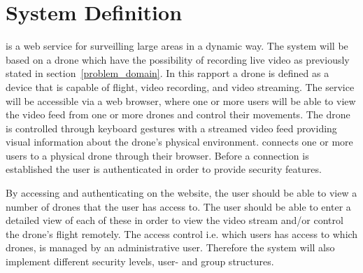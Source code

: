 \section{System Definition}
\projectname{} is a web service for surveilling large areas in a dynamic way. 
The system will be based on a drone which have the possibility of recording live video as previously stated in section~\ref{problem_domain}.
In this rapport a drone is defined as a device that is capable of flight, video recording, and video streaming.
The service will be accessible via a web browser, where one or more users will be able to view the video feed from one or more drones and control their movements. 
The drone is controlled through keyboard gestures with a streamed video feed providing visual information about the drone's physical environment. 
\projectname{} connects one or more users to a physical drone through their browser. 
Before a connection is established the user is authenticated in order to provide security features.

By accessing and authenticating on the website, the user should be able to view a number of drones that the user has access to.
The user should be able to enter a detailed view of each of these in order to view the video stream and/or control the drone's flight remotely. 
The access control i.e. which users has access to which drones, is managed by an administrative user.
Therefore the system will also implement different security levels, user- and group structures. 
